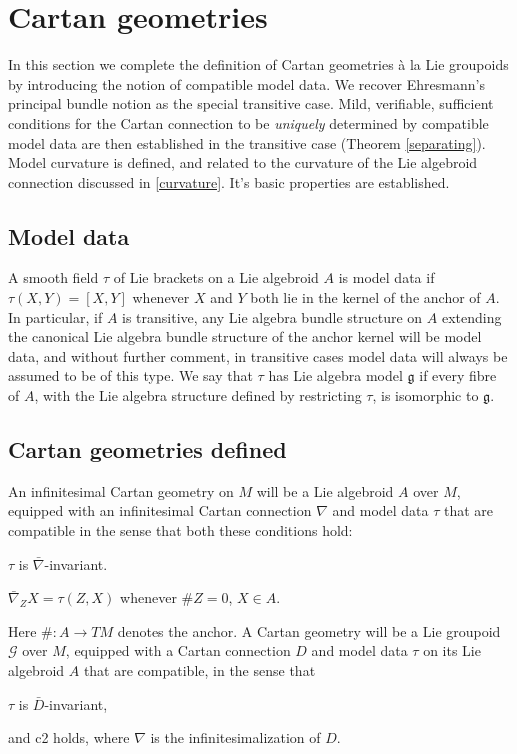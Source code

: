 \documentclass[leqno,12pt]{amsart} %
\newcommand\refreshpage{\newpage}
\newcommand\refreshpage{}
\begin{document}
\refreshpage
\section{Cartan geometries}\label{cartan_geometries}
In this section we complete the definition of Cartan geometries \`a la Lie groupoids by
introducing the notion of compatible model data. We recover Ehresmann's principal bundle
notion as the special transitive case. Mild, verifiable, sufficient conditions for the
Cartan connection to be {\em uniquely} determined by compatible model data are then
established in the transitive case (Theorem \ref{separating}). Model curvature is
defined, and related to the curvature of the Lie algebroid connection discussed in
\ref{curvature}. It's basic properties are established.

\subsection{Model data}\label{md}
A smooth field $\tau $ of Lie brackets on a Lie algebroid $A$ is {\df model data} if
$\tau(X,Y) = [X, Y]$ whenever $X$ and $Y$ both lie in the kernel of the anchor of $A$. In
particular, if $A$ is transitive, any Lie algebra bundle structure on $A$ extending the
canonical Lie algebra bundle structure of the anchor kernel will be model data, and
without further comment, in transitive cases model data will always be assumed to be of
this type. We say that $\tau $ {\df has Lie algebra model} ${\mathfrak g} $ if every fibre
of $A$, with the Lie algebra structure defined by restricting $\tau $, is isomorphic to
${\mathfrak g} $.

\subsection{Cartan geometries defined}\label{preview}
An {\df infinitesimal Cartan geometry} on $M$ will be a Lie algebroid $A$ over $M$,
equipped with an infinitesimal Cartan connection $\nabla $ and model data $\tau $ that are
{\df compatible} in the sense that both these conditions hold:
\begin{conditions}
  \item[{\bf c1.}] $\tau $ is $\bar\nabla$-invariant.
  \item[{\bf c2.}] $\bar\nabla_ZX = \tau(Z, X)$ whenever $\#Z=0$, $X \in A$.
\end{conditions}
Here $\# \colon A \rightarrow TM $ denotes the anchor. A {\df Cartan geometry} will be a
Lie groupoid ${\mathcal G} $ over $M$, equipped with a Cartan connection $D$ and model
data $\tau$ on its Lie algebroid $A$ that are {\df compatible}, in the sense that
\begin{conditions}
      \item[{\bf C1.}] $\tau $ is $\bar D$-invariant,
\end{conditions}
and c2 holds, where $\nabla $ is the infinitesimalization of $D$.
\end{document}
